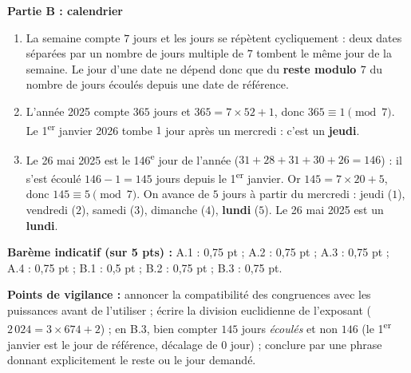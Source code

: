 \documentclass[11pt]{article}
\begin{document}
\begin{corrige}
\textbf{Partie B : calendrier}
\begin{enumerate}
\item La semaine compte $7$ jours et les jours se répètent cycliquement : deux dates séparées par un nombre de jours multiple de $7$ tombent le même jour de la semaine. Le jour d'une date ne dépend donc que du \textbf{reste modulo $7$} du nombre de jours écoulés depuis une date de référence.
\item L'année 2025 compte $365$ jours et $365 = 7 \times 52 + 1$, donc $365 \equiv 1 \pmod{7}$. Le 1\textsuperscript{er} janvier 2026 tombe $1$ jour après un mercredi : c'est un \textbf{jeudi}.
\item Le 26 mai 2025 est le 146\textsuperscript{e} jour de l'année ($31 + 28 + 31 + 30 + 26 = 146$) : il s'est écoulé $146 - 1 = 145$ jours depuis le 1\textsuperscript{er} janvier. Or $145 = 7 \times 20 + 5$, donc $145 \equiv 5 \pmod{7}$. On avance de $5$ jours à partir du mercredi : jeudi ($1$), vendredi ($2$), samedi ($3$), dimanche ($4$), \textbf{lundi} ($5$). Le 26 mai 2025 est un \textbf{lundi}.
\end{enumerate}

\textbf{Barème indicatif (sur 5 pts) :} A.1 : 0,75 pt ; A.2 : 0,75 pt ; A.3 : 0,75 pt ; A.4 : 0,75 pt ; B.1 : 0,5 pt ; B.2 : 0,75 pt ; B.3 : 0,75 pt.

\textbf{Points de vigilance :} annoncer la compatibilité des congruences avec les puissances avant de l'utiliser ; écrire la division euclidienne de l'exposant ($2\,024 = 3 \times 674 + 2$) ; en B.3, bien compter $145$ jours \emph{écoulés} et non $146$ (le 1\textsuperscript{er} janvier est le jour de référence, décalage de $0$ jour) ; conclure par une phrase donnant explicitement le reste ou le jour demandé.
\end{corrige}
\end{document}
